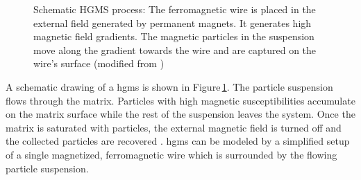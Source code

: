 \begin{figure}[H]
\centering

\caption[Schematic HGMS process]{Schematic HGMS process: The ferromagnetic wire is placed in the external field generated by permanent magnets. It generates high magnetic field gradients. The magnetic particles in the suspension move along the gradient towards the wire and are captured on the wire's surface (modified from \cite{FranzrebHabil}) 
\label{fig:hgms}
}
\end{figure}

A schematic drawing of a \gls{hgms} is shown in Figure\,\ref{fig:hgms}. The particle suspension flows through the matrix. Particles with high magnetic susceptibilities accumulate on the matrix surface while the rest of the suspension leaves the system. Once the matrix is saturated with particles, the external magnetic field is turned off and the collected particles are recovered \cite{svoboda2004magnetic,gerber1983high,ditsch2005high}. \gls{hgms} can be modeled by a simplified setup of a single magnetized, ferromagnetic wire which is surrounded by the flowing particle suspension. %

